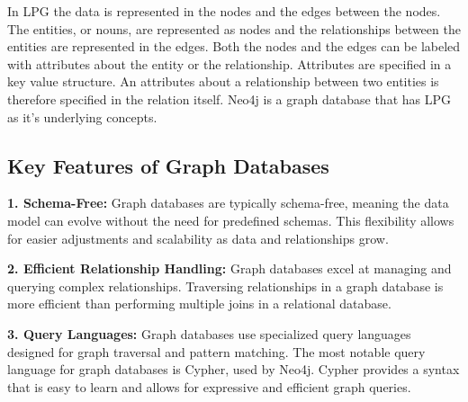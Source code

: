 In LPG the data is represented in the nodes and the edges between the nodes. The entities, or nouns, are represented as nodes and the relationships between the entities are represented in the edges. Both the nodes and the edges can be labeled with attributes about the entity or the relationship. Attributes are specified in a key value structure. An attributes about a relationship between two entities is therefore specified in the relation itself. Neo4j is a graph database that has LPG as it's underlying concepts.

\subsection{Key Features of Graph Databases}

\textbf{1. Schema-Free:} Graph databases are typically schema-free, meaning the data model can evolve without the need for predefined schemas. This flexibility allows for easier adjustments and scalability as data and relationships grow.

\textbf{2. Efficient Relationship Handling:} Graph databases excel at managing and querying complex relationships. Traversing relationships in a graph database is more efficient than performing multiple joins in a relational database.

\textbf{3. Query Languages:} Graph databases use specialized query languages designed for graph traversal and pattern matching. The most notable query language for graph databases is Cypher, used by Neo4j. Cypher provides a syntax that is easy to learn and allows for expressive and efficient graph queries.





